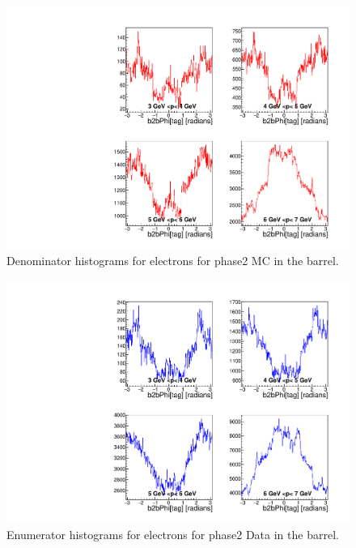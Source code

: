 \documentclass[a4paper,11pt,twosided,final,german,openbib,pdftex,listof=totoc,bibliography=totoc]{scrbook}
\begin{document}
\begin{appendix}
\begin{figure}[!htbp]
	\centering
	\includegraphics[width=\textwidth]{Plots/master/xPMPhiemBarrelD_MC}
	\caption[Momentum $\phi$ Electron Barrel Denominator Histogram Phase2 MC]{Denominator histograms for electrons for phase2 MC in the barrel.}
	\label{plt:PMPhiemBarrelD_MC}
\end{figure}


\begin{figure}[!htbp]
	\centering
	\includegraphics[width=\textwidth]{Plots/master/xPMPhiemBarrelE_Data}
	\caption[Momentum $\phi$ Electron Barrel Enumerator Histogram Phase2 Data]{Enumerator histograms for electrons for phase2 Data in the barrel.}
	\label{plt:PMPhiemBarrelE_Data}
\end{figure}


\end{appendix}
\end{document}
